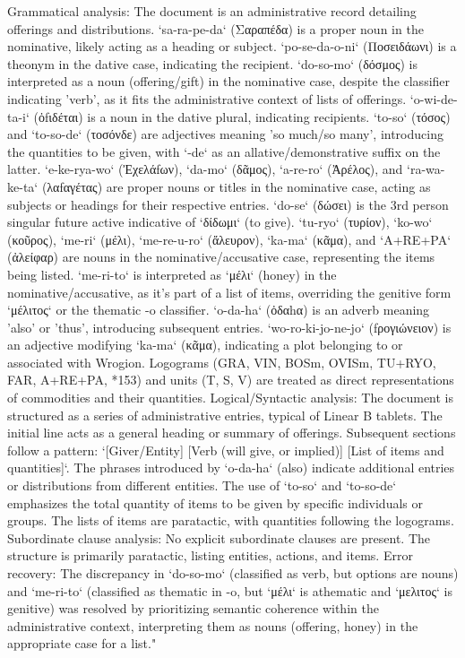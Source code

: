 Grammatical analysis: The document is an administrative record detailing offerings and distributions. `sa-ra-pe-da` (Σαραπέδα) is a proper noun in the nominative, likely acting as a heading or subject. `po-se-da-o-ni` (Ποσειδάωνι) is a theonym in the dative case, indicating the recipient. `do-so-mo` (δόσμος) is interpreted as a noun (offering/gift) in the nominative case, despite the classifier indicating 'verb', as it fits the administrative context of lists of offerings. `o-wi-de-ta-i` (ὀfιδέται) is a noun in the dative plural, indicating recipients. `to-so` (τόσος) and `to-so-de` (τοσόνδε) are adjectives meaning 'so much/so many', introducing the quantities to be given, with `-de` as an allative/demonstrative suffix on the latter. `e-ke-rya-wo` (Ἐχελάfων), `da-mo` (δᾶμος), `a-re-ro` (Ἀρέλος), and `ra-wa-ke-ta` (λαfαγέτας) are proper nouns or titles in the nominative case, acting as subjects or headings for their respective entries. `do-se` (δώσει) is the 3rd person singular future active indicative of `δίδωμι` (to give). `tu-ryo` (τυρίον), `ko-wo` (κοῦρος), `me-ri` (μέλι), `me-re-u-ro` (ἄλευρον), `ka-ma` (κᾶμα), and `A+RE+PA` (ἀλείφαρ) are nouns in the nominative/accusative case, representing the items being listed. `me-ri-to` is interpreted as `μέλι` (honey) in the nominative/accusative, as it's part of a list of items, overriding the genitive form `μέλιτος` or the thematic -o classifier. `o-da-ha` (ὀδαhα) is an adverb meaning 'also' or 'thus', introducing subsequent entries. `wo-ro-ki-jo-ne-jo` (fρογιώνειον) is an adjective modifying `ka-ma` (κᾶμα), indicating a plot belonging to or associated with Wrogion. Logograms (GRA, VIN, BOSm, OVISm, TU+RYO, FAR, A+RE+PA, *153) and units (T, S, V) are treated as direct representations of commodities and their quantities. Logical/Syntactic analysis: The document is structured as a series of administrative entries, typical of Linear B tablets. The initial line acts as a general heading or summary of offerings. Subsequent sections follow a pattern: `[Giver/Entity] [Verb (will give, or implied)] [List of items and quantities]`. The phrases introduced by `o-da-ha` (also) indicate additional entries or distributions from different entities. The use of `to-so` and `to-so-de` emphasizes the total quantity of items to be given by specific individuals or groups. The lists of items are paratactic, with quantities following the logograms. Subordinate clause analysis: No explicit subordinate clauses are present. The structure is primarily paratactic, listing entities, actions, and items. Error recovery: The discrepancy in `do-so-mo` (classified as verb, but options are nouns) and `me-ri-to` (classified as thematic in -o, but `μέλι` is athematic and `μελιτος` is genitive) was resolved by prioritizing semantic coherence within the administrative context, interpreting them as nouns (offering, honey) in the appropriate case for a list."

